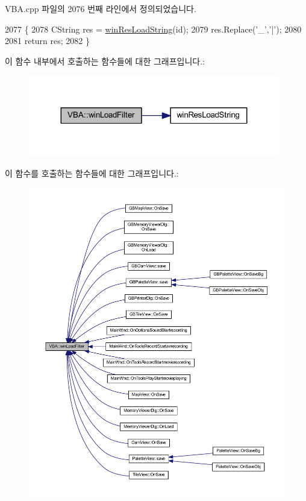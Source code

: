 V\+B\+A.\+cpp 파일의 2076 번째 라인에서 정의되었습니다.


\begin{DoxyCode}
2077 \{
2078   CString res = \mbox{\hyperlink{_win_res_util_8cpp_a416e85e80ab9b01376e87251c83d1a5a}{winResLoadString}}(\textcolor{keywordtype}{id});
2079   res.Replace(\textcolor{charliteral}{'\_'},\textcolor{charliteral}{'|'});
2080   
2081   \textcolor{keywordflow}{return} res;
2082 \}
\end{DoxyCode}
이 함수 내부에서 호출하는 함수들에 대한 그래프입니다.\+:
\nopagebreak
\begin{figure}[H]
\begin{center}
\leavevmode
\includegraphics[width=311pt]{class_v_b_a_a228edf26b0dc4129658c174ee5a3c27c_cgraph}
\end{center}
\end{figure}
이 함수를 호출하는 함수들에 대한 그래프입니다.\+:
\nopagebreak
\begin{figure}[H]
\begin{center}
\leavevmode
\includegraphics[width=350pt]{class_v_b_a_a228edf26b0dc4129658c174ee5a3c27c_icgraph}
\end{center}
\end{figure}
\mbox{\label{class_v_b_a_abbf1f3cbda50fca40ddf50a6fafe8e05}} 
